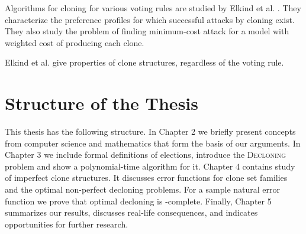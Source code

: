 Algorithms for cloning for various voting rules are studied by Elkind et al. \cite{cloninginelections}.
They characterize the preference profiles for which successful attacks by cloning exist.
They also study the problem of finding minimum-cost attack for a model with weighted cost of producing each clone.

Elkind et al. \cite{clonestructures} give properties of clone structures, regardless of the voting rule.


\section{Structure of the Thesis}

This thesis has the following structure.
In Chapter 2 we briefly present concepts from computer science
and mathematics that form the basis of our arguments.
In Chapter 3 we include formal definitions of elections, introduce the \textsc{Decloning} problem
and show a polynomial-time algorithm for it.
Chapter 4 contains study of imperfect clone structures.
It discusses error functions for clone set families and the optimal non-perfect decloning problems.
For a sample natural error function we prove that optimal decloning is \np-complete.
Finally, Chapter 5 summarizes our results, discusses real-life consequences,
and indicates opportunities for further research.
